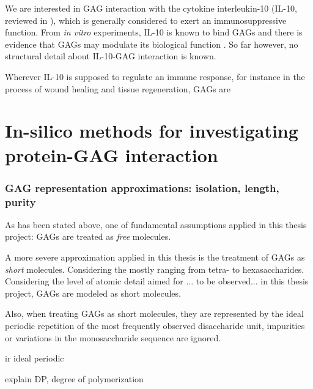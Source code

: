 We are interested in GAG interaction with the cytokine interleukin-10 (IL-10,
reviewed in \cite{moore_2001}), which is generally considered to exert an
immunosuppressive function. From \textit{in vitro} experiments, IL-10 is known
to bind GAGs and there is evidence that GAGs may modulate its biological
function \cite{salek_ardakani_2000}. So far however, no structural detail about
IL-10-GAG interaction is known.


Wherever IL-10 is supposed to
regulate an immune response, for instance in the process of wound healing and
tissue regeneration, GAGs are


\section{In-silico methods for investigating protein-GAG interaction}


\subsubsection{GAG representation approximations: isolation, length, purity}

As has been stated above, one of fundamental assumptions applied in this thesis
project: GAGs are treated as \textit{free} molecules.


A more severe approximation applied in this thesis is the treatment of GAGs as
\textit{short} molecules. Considering the  mostly ranging from tetra- to hexasaccharides. Considering the level of atomic detail aimed for ... to be observed... in this
thesis project, GAGs are modeled as short molecules.


Also, when treating GAGs as short molecules, they are represented by the ideal
periodic repetition of the most frequently observed disaccharide unit,
impurities or variations in the monosaccharide sequence are ignored.

ir ideal periodic

explain DP, degree of polymerization




